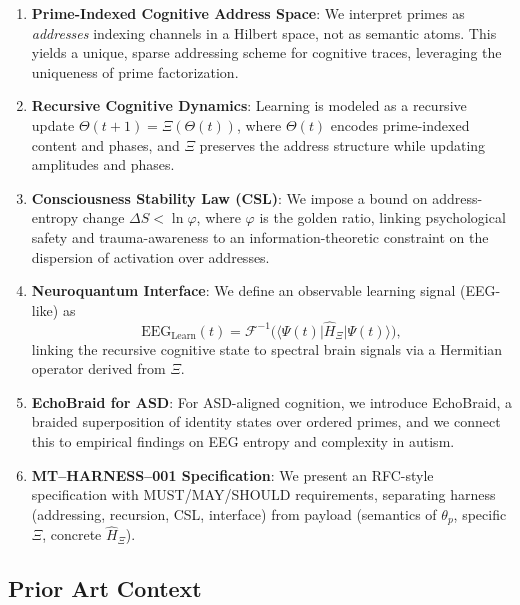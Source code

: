 \documentclass[11pt]{article}
\begin{document}
\begin{enumerate}[noitemsep]
  \item \textbf{Prime-Indexed Cognitive Address Space}: We interpret primes as \emph{addresses} indexing channels in a Hilbert space, not as semantic atoms. This yields a unique, sparse addressing scheme for cognitive traces, leveraging the uniqueness of prime factorization.

  \item \textbf{Recursive Cognitive Dynamics}: Learning is modeled as a recursive update $\Theta(t+1) = \Xi(\Theta(t))$, where $\Theta(t)$ encodes prime-indexed content and phases, and $\Xi$ preserves the address structure while updating amplitudes and phases.

  \item \textbf{Consciousness Stability Law (CSL)}: We impose a bound on address-entropy change $\Delta S < \ln \varphi$, where $\varphi$ is the golden ratio, linking psychological safety and trauma-awareness to an information-theoretic constraint on the dispersion of activation over addresses. \cite{neuroplasticityMT,EEGEntropyForce,GoldenEEG,EEGEntropyBiomarker}

  \item \textbf{Neuroquantum Interface}: We define an observable learning signal (EEG-like) as
  \[
  \mathrm{EEG}_{\mathrm{Learn}}(t) = \mathcal{F}^{-1}\big(\langle \Psi(t) \vert \hat{H}_\Xi \vert \Psi(t) \rangle\big),
  \]
  linking the recursive cognitive state to spectral brain signals via a Hermitian operator derived from $\Xi$. \cite{neuroplasticityMT,QuantumEEG1,QuantumEEG2}

  \item \textbf{EchoBraid for ASD}: For ASD-aligned cognition, we introduce EchoBraid, a braided superposition of identity states over ordered primes, and we connect this to empirical findings on EEG entropy and complexity in autism. \cite{neuroplasticityMT,EEGEntropyASD,EEGEntropyASD2}

  \item \textbf{MT--HARNESS--001 Specification}: We present an RFC-style specification with MUST/MAY/SHOULD requirements, separating harness (addressing, recursion, CSL, interface) from payload (semantics of $\theta_p$, specific $\Xi$, concrete $\hat{H}_\Xi$).
\end{enumerate}

\subsection{Prior Art Context}
\end{document}
